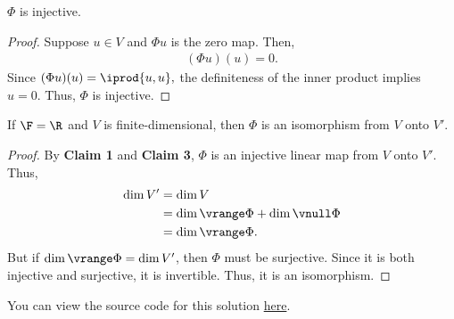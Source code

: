 \documentclass{amsart}
\newcommand{\pagenum}{190}
\newcommand{\probnum}{17}
\begin{document}
\vspace{0.5in}

\begin{claim}
 $\Phi$ is injective.
\end{claim}
\begin{proof}
Suppose $u\in V$ and $\Phi u$ is the zero map. Then,
\begin{align*}
    (\Phi u)(u) = 0.
\end{align*}
Since $(\Phi u)(u)=\iprod{u,u},$ the definiteness of the inner
product implies $u=0.$
Thus, $\Phi$ is injective.
\end{proof}

\vspace{0.5in}

\begin{claim}
    If $\F=\R$ and $V$ is finite-dimensional, then
    $\Phi$ is an isomorphism from $V$ onto $V'.$
\end{claim}
\begin{proof}
By \textsf{\textbf{Claim 1}} and \textsf{\textbf{Claim 3}},
$\Phi$ is an injective linear map from $V$ onto $V'.$ Thus,
\begin{align*}
    \dim V' &= \dim V \\
            &= \dim\vrange\Phi+\dim\vnull\Phi \\
            &= \dim\vrange\Phi.
\end{align*}
But if $\dim\vrange\Phi=\dim V'$, then  $\Phi$ must be surjective.
Since it is both injective and surjective, it is invertible.
Thus, it is an isomorphism.
\end{proof}

\vspace{0.5in}


\begin{note*}
You can view the source code for this solution
\href{https://github.com/thomasbreydo/linalg/blob/main/\pagenum_\probnum_Thomas_Breydo.tex}
{here}.
\end{note*}
\end{document}
